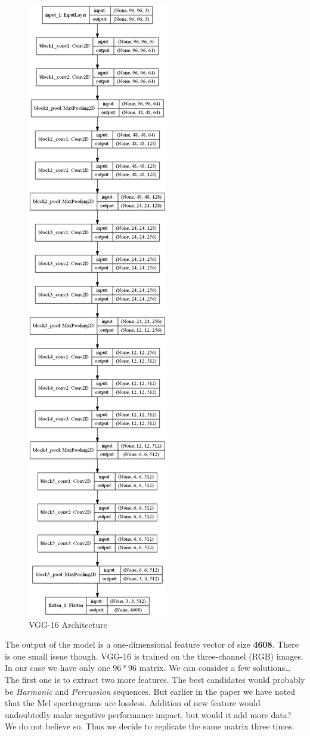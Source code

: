 \begin{Schunk}
\begin{figure}[H]

{\centering \includegraphics[width=0.3\linewidth]{../images/VGG-16_architecture} 

}

\caption[VGG-16 Architecture]{VGG-16 Architecture}\label{fig:vgg}
\end{figure}
\end{Schunk}

The output of the model is a one-dimensional feature vector of size
\textbf{4608}. There is one small issue though. VGG-16 is trained on the
three-channel (RGB) images. In our case we have only one \({96} * {96}\)
matrix. We can consider a few solutions\ldots{} The first one is to
extract two more features. The best candidates would probably be
\emph{Harmonic} and \emph{Percussion} sequences. But earlier in the
paper we have noted that the Mel spectrograms are lossless. Addition of
new feature would undoubtedly make negative performance impact, but
would it add more data? We do not believe so. Thus we decide to
replicate the same matrix three times.

